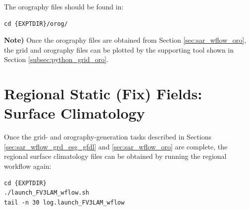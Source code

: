 \documentclass[11pt,fleqn]{report}              %
\begin{document}
The orography files should be found in:
\lstset{language=bash}   
\begin{lstlisting}[frame=trBL]
cd {EXPTDIR}/orog/
\end{lstlisting}

\vspace{0.3cm}

{\bf Note)} Once the orography files are obtained from Section \ref{sec:sar_wflow_oro}, the grid and orography files can be plotted by the supporting tool shown in Section \ref{subsec:python_grid_oro}.



\section{Regional Static (Fix) Fields: Surface Climatology}
\label{sec:sar_wflow_static}

Once the grid- and orography-generation tasks described in Sections \ref{sec:sar_wflow_grd_esg_gfdl} and \ref{sec:sar_wflow_oro} are complete, the regional surface climatology files can be obtained by running the regional workflow again: 

\lstset{language=bash}   
\begin{lstlisting}[frame=trBL]
cd {EXPTDIR}
./launch_FV3LAM_wflow.sh
tail -n 30 log.launch_FV3LAM_wflow
\end{lstlisting}

\vspace{0.3cm}
\end{document}
